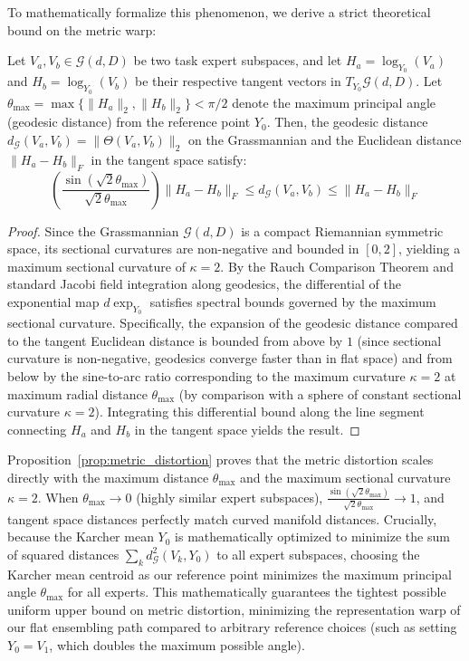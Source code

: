 To mathematically formalize this phenomenon, we derive a strict theoretical bound on the metric warp:
\begin{proposition}
\label{prop:metric_distortion}
Let $V_a, V_b \in \mathcal{G}(d, D)$ be two task expert subspaces, and let $H_a = \log_{Y_0}(V_a)$ and $H_b = \log_{Y_0}(V_b)$ be their respective tangent vectors in $T_{Y_0}\mathcal{G}(d, D)$. Let $\theta_{\max} = \max\{\|H_a\|_2, \|H_b\|_2\} < \pi/2$ denote the maximum principal angle (geodesic distance) from the reference point $Y_0$. Then, the geodesic distance $d_{\mathcal{G}}(V_a, V_b) = \|\Theta(V_a, V_b)\|_2$ on the Grassmannian and the Euclidean distance $\|H_a - H_b\|_F$ in the tangent space satisfy:
\begin{equation}
    \left( \frac{\sin(\sqrt{2}\theta_{\max})}{\sqrt{2}\theta_{\max}} \right) \|H_a - H_b\|_F \le d_{\mathcal{G}}(V_a, V_b) \le \|H_a - H_b\|_F
\end{equation}
\end{proposition}
\begin{proof}
Since the Grassmannian $\mathcal{G}(d, D)$ is a compact Riemannian symmetric space, its sectional curvatures are non-negative and bounded in $[0, 2]$, yielding a maximum sectional curvature of $\kappa = 2$. By the Rauch Comparison Theorem and standard Jacobi field integration along geodesics, the differential of the exponential map $d\exp_{Y_0}$ satisfies spectral bounds governed by the maximum sectional curvature. Specifically, the expansion of the geodesic distance compared to the tangent Euclidean distance is bounded from above by $1$ (since sectional curvature is non-negative, geodesics converge faster than in flat space) and from below by the sine-to-arc ratio corresponding to the maximum curvature $\kappa = 2$ at maximum radial distance $\theta_{\max}$ (by comparison with a sphere of constant sectional curvature $\kappa = 2$). Integrating this differential bound along the line segment connecting $H_a$ and $H_b$ in the tangent space yields the result.
\end{proof}
Proposition~\ref{prop:metric_distortion} proves that the metric distortion scales directly with the maximum distance $\theta_{\max}$ and the maximum sectional curvature $\kappa = 2$. When $\theta_{\max} \to 0$ (highly similar expert subspaces), $\frac{\sin(\sqrt{2}\theta_{\max})}{\sqrt{2}\theta_{\max}} \to 1$, and tangent space distances perfectly match curved manifold distances. Crucially, because the Karcher mean $Y_0$ is mathematically optimized to minimize the sum of squared distances $\sum_k d_{\mathcal{G}}^2(V_k, Y_0)$ to all expert subspaces, choosing the Karcher mean centroid as our reference point minimizes the maximum principal angle $\theta_{\max}$ for all experts. This mathematically guarantees the tightest possible uniform upper bound on metric distortion, minimizing the representation warp of our flat ensembling path compared to arbitrary reference choices (such as setting $Y_0 = V_1$, which doubles the maximum possible angle).

